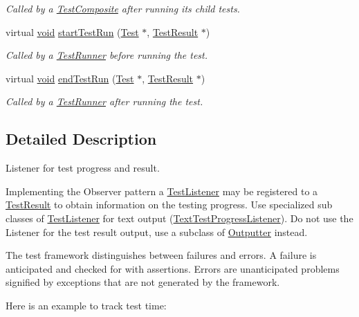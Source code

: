 \begin{DoxyCompactItemize}
\begin{DoxyCompactList}\small\item\em Called by a \hyperlink{class_test_composite}{Test\-Composite} after running its child tests. \end{DoxyCompactList}\item 
virtual \hyperlink{wglew_8h_aeea6e3dfae3acf232096f57d2d57f084}{void} \hyperlink{class_test_listener_a263428abdf29b2a7123af4096771925e}{start\-Test\-Run} (\hyperlink{class_test}{Test} $\ast$, \hyperlink{class_test_result}{Test\-Result} $\ast$)
\begin{DoxyCompactList}\small\item\em Called by a \hyperlink{class_test_runner}{Test\-Runner} before running the test. \end{DoxyCompactList}\item 
virtual \hyperlink{wglew_8h_aeea6e3dfae3acf232096f57d2d57f084}{void} \hyperlink{class_test_listener_a0411708032f688f6ec234bcc5e089289}{end\-Test\-Run} (\hyperlink{class_test}{Test} $\ast$, \hyperlink{class_test_result}{Test\-Result} $\ast$)
\begin{DoxyCompactList}\small\item\em Called by a \hyperlink{class_test_runner}{Test\-Runner} after running the test. \end{DoxyCompactList}\end{DoxyCompactItemize}


\subsection{Detailed Description}
Listener for test progress and result.

Implementing the Observer pattern a \hyperlink{class_test_listener}{Test\-Listener} may be registered to a \hyperlink{class_test_result}{Test\-Result} to obtain information on the testing progress. Use specialized sub classes of \hyperlink{class_test_listener}{Test\-Listener} for text output (\hyperlink{class_text_test_progress_listener}{Text\-Test\-Progress\-Listener}). Do not use the Listener for the test result output, use a subclass of \hyperlink{class_outputter}{Outputter} instead. 

The test framework distinguishes between failures and errors. A failure is anticipated and checked for with assertions. Errors are unanticipated problems signified by exceptions that are not generated by the framework.

Here is an example to track test time\-:


